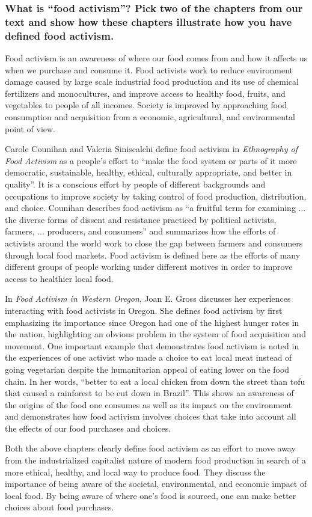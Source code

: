 \documentclass{article}
\begin{document}
\subsubsection*{What is “food activism”? Pick two of the chapters from our text
and show how these chapters illustrate how you have defined food activism.}
Food activism is an awareness of where our food comes from and how it affects
us when we purchase and consume it. Food activists work to reduce environment
damage caused by large scale industrial food production and its use of
chemical fertilizers and monocultures, and improve access to healthy food,
fruits, and vegetables to people of all incomes. Society is improved by
approaching food consumption and acquisition from a economic, agricultural, and
environmental point of view. \par
Carole Counihan and Valeria Siniscalchi define food activism in \textit{
Ethnography of Food Activism} as a people's effort to ``make the food system
or parts of it more democratic, sustainable, healthy, ethical, culturally
appropriate, and better in quality''. It is a conscious effort by people of
different backgrounds and occupations to improve society by taking control of
food production, distribution, and choice. Counihan describes food activism as
``a fruitful term for examining ... the diverse forms of dissent and resistance
practiced by political activists, farmers, ... producers, and consumers'' and
summarizes how the efforts of activists around the world work to close the gap
between farmers and consumers through local food markets. Food activism is
defined here as the efforts of many different groups of people working under
different motives in order to improve access to healthier local food. \par
In \textit{Food Activism in Western Oregon}, Joan E. Gross discusses her
experiences interacting with food activists in Oregon. She defines food
activism by first emphasizing its importance since Oregon had one of the
highest hunger rates in the nation, highlighting an obvious problem in the
system of food acquisition and movement. One important example that
demonstrates food activism is noted in the experiences of one activist who made
a choice to eat local meat instead of going vegetarian despite the humanitarian
appeal of eating lower on the food chain. In her words, ``better to eat a local
chicken from down the street than tofu that caused a rainforest to be cut down
in Brazil''. This shows an awareness of the origins of the food one consumes as
well as its impact on the environment and demonstrates how food activism
involves choices that take into account all the effects of our food purchases
and choices. \par
Both the above chapters clearly define food activism as an effort to move away
from the industrialized capitalist nature of modern food production in search
of a more ethical, healthy, and local way to produce food. They discuss the
importance of being aware of the societal, environmental, and economic impact
of local food. By being aware of where one's food is sourced, one can make
better choices about food purchases.
\end{document}
